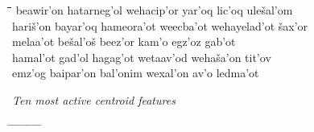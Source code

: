 \begin{figure}[!htb]
\begin{mdframed}
\begin{tabbing}
\hspace*{14ex}\= \hspace*{14ex}\=\hspace*{14ex}\=\hspace*{14ex}\=\hspace*{14ex}\=\hspace*{14ex} \kill
beawir\a'{o}n \> hatarneg\a'{o}l \> wehacip\a'{o}r \> yar\a'{o}q \> lic\a'{o}q \> ule\v{s}al\a'{o}m \\
hari\v{s}\a'{o}n \> bayar\a'{o}q \> hameora\a'{o}t \> weecba\a'{o}t \> wehayelad\a'{o}t \> \v{s}ax\a'{o}r \\
melaa\a'{o}t \> be\v{s}al\a'{o}\v{s} \> beez\a'{o}r \> kam\a'{o} \> egz\a'{o}z \> gab\a'{o}t \\
hamal\a'{o}t \> gad\a'{o}l \> hagag\a'{o}t \> wetaav\a'{o}d \> weha\v{s}a\a'{o}n \> tit\a'{o}v \\
emz\a'{o}g \> baipar\a'{o}n \> bal\a'{o}nim \> wexal\a'{o}n \> av\a'{o} \> ledma\a'{o}t 
\end{tabbing}
\begin{mdframed}
\begin{small}
\textit{Ten most active centroid features}
\begin{tabbing}
\hspace{6ex} \= \hspace{10ex} \= \hspace{6ex} \= \hspace{10ex} \= \hspace{6ex} \= \hspace{10ex} \= \hspace{6ex} \= \hspace{10ex} \= \hspace{6ex} \= \hspace{10ex} \kill

\end{tabbing}
\end{small}
\end{mdframed}
\end{mdframed}
\end{figure}
